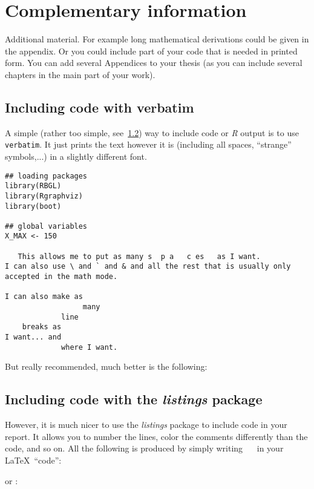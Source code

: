 \chapter{Complementary information}
\label{app:complement}

Additional material. For example long mathematical derivations could be
given in the appendix. Or you could include part of your code that is
needed in printed form. You can add several Appendices to your thesis (as
you can include several chapters in the main part of your work).

\section{Including \Rp code with verbatim}
A simple (rather too simple, see~\ref{App:listings}) way to include code or
  {\it R} output is to use
\texttt{verbatim}. It just prints the text however it is (including all
spaces, ``strange'' symbols,...) in a slightly different font.
\begin{verbatim}
## loading packages
library(RBGL)
library(Rgraphviz)
library(boot)

## global variables
X_MAX <- 150

   This allows me to put as many s  p a   c es   as I want.
I can also use \ and ` and & and all the rest that is usually only 
accepted in the math mode.

I can also make as 
                  many 
             line 
    breaks as 
I want... and
             where I want. 
\end{verbatim}

But really recommended,  much better is the following:

\section{Including \Rp code with the \emph{listings} package}\label{App:listings}
However, it is much nicer to use the \emph{listings} package to include \Rp
code in your report. It allows you to number the lines, color the comments
differently than the code, and so on.
All the following is produced by simply writing
\verb!  !  in your \LaTeX\ ``code'':



or \verb!! :


